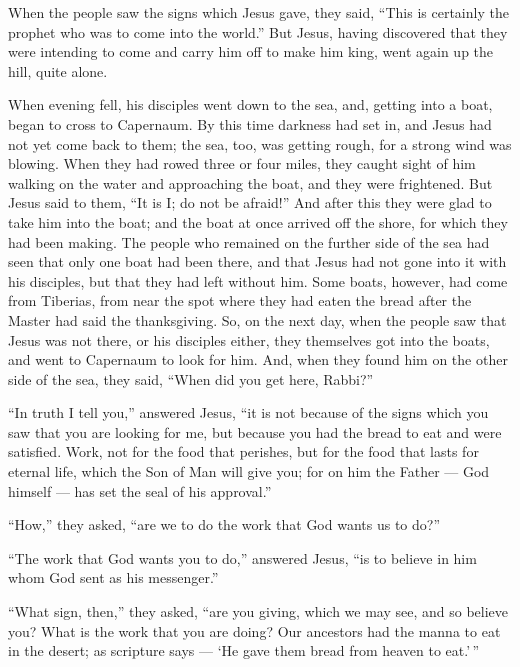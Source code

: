  When the people saw the signs which Jesus gave, they said,
``This is certainly the prophet who was to come into the world.''
 But Jesus, having discovered that they were intending to
come and carry him off to make him king, went again up the hill, quite
alone.

 When evening fell, his disciples went down to the sea,
 and, getting into a boat, began to cross to Capernaum. By
this time darkness had set in, and Jesus had not yet come back to them;
 the sea, too, was getting rough, for a strong wind was
blowing.  When they had rowed three or four miles, they
caught sight of him walking on the water and approaching the boat, and
they were frightened.  But Jesus said to them, ``It is I;
do not be afraid!''  And after this they were glad to take
him into the boat; and the boat at once arrived off the shore, for which
they had been making.  The people who remained on the
further side of the sea had seen that only one boat had been there, and
that Jesus had not gone into it with his disciples, but that they had
left without him.  Some boats, however, had come from
Tiberias, from near the spot where they had eaten the bread after the
Master had said the thanksgiving.  So, on the next day,
when the people saw that Jesus was not there, or his disciples either,
they themselves got into the boats, and went to Capernaum to look for
him.  And, when they found him on the other side of the
sea, they said, ``When did you get here, Rabbi?''

 ``In truth I tell you,'' answered Jesus, ``it is not
because of the signs which you saw that you are looking for me, but
because you had the bread to eat and were satisfied.  Work,
not for the food that perishes, but for the food that lasts for eternal
life, which the Son of Man will give you; for on him the Father --- God
himself --- has set the seal of his approval.''

 ``How,'' they asked, ``are we to do the work that God
wants us to do?''

 ``The work that God wants you to do,'' answered Jesus,
``is to believe in him whom God sent as his messenger.''

 ``What sign, then,'' they asked, ``are you giving, which
we may see, and so believe you? What is the work that you are doing?
 Our ancestors had the manna to eat in the desert; as
scripture says --- `He gave them bread from heaven to eat.'\,''

